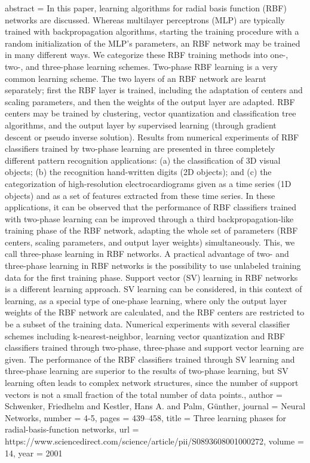 {abstract = {In this paper, learning algorithms for radial basis function (RBF) networks are discussed. Whereas multilayer perceptrons (MLP) are typically trained with backpropagation algorithms, starting the training procedure with a random initialization of the MLP's parameters, an RBF network may be trained in many different ways. We categorize these RBF training methods into one-, two-, and three-phase learning schemes. Two-phase RBF learning is a very common learning scheme. The two layers of an RBF network are learnt separately; first the RBF layer is trained, including the adaptation of centers and scaling parameters, and then the weights of the output layer are adapted. RBF centers may be trained by clustering, vector quantization and classification tree algorithms, and the output layer by supervised learning (through gradient descent or pseudo inverse solution). Results from numerical experiments of RBF classifiers trained by two-phase learning are presented in three completely different pattern recognition applications: (a) the classification of 3D visual objects; (b) the recognition hand-written digits (2D objects); and (c) the categorization of high-resolution electrocardiograms given as a time series (1D objects) and as a set of features extracted from these time series. In these applications, it can be observed that the performance of RBF classifiers trained with two-phase learning can be improved through a third backpropagation-like training phase of the RBF network, adapting the whole set of parameters (RBF centers, scaling parameters, and output layer weights) simultaneously. This, we call three-phase learning in RBF networks. A practical advantage of two- and three-phase learning in RBF networks is the possibility to use unlabeled training data for the first training phase. Support vector (SV) learning in RBF networks is a different learning approach. SV learning can be considered, in this context of learning, as a special type of one-phase learning, where only the output layer weights of the RBF network are calculated, and the RBF centers are restricted to be a subset of the training data. Numerical experiments with several classifier schemes including k-nearest-neighbor, learning vector quantization and RBF classifiers trained through two-phase, three-phase and support vector learning are given. The performance of the RBF classifiers trained through SV learning and three-phase learning are superior to the results of two-phase learning, but SV learning often leads to complex network structures, since the number of support vectors is not a small fraction of the total number of data points.},
author = {Schwenker, Friedhelm and Kestler, Hans A. and Palm, G{\"{u}}nther},
journal = {Neural Networks},
number = {4-5},
pages = {439--458},
title = {{Three learning phases for radial-basis-function networks}},
url = {https://www.sciencedirect.com/science/article/pii/S0893608001000272},
volume = {14},
year = {2001}
}
